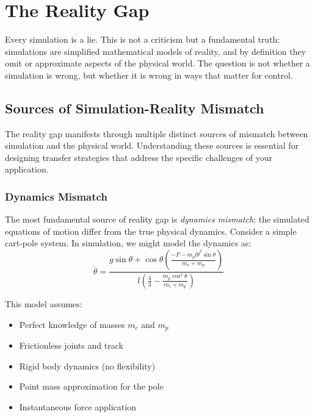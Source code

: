 \section{The Reality Gap}
\label{sec:reality_gap}

Every simulation is a lie. This is not a criticism but a fundamental truth: simulations are simplified mathematical models of reality, and by definition they omit or approximate aspects of the physical world. The question is not whether a simulation is wrong, but whether it is wrong in ways that matter for control.

\subsection{Sources of Simulation-Reality Mismatch}

The reality gap manifests through multiple distinct sources of mismatch between simulation and the physical world. Understanding these sources is essential for designing transfer strategies that address the specific challenges of your application.

\subsubsection{Dynamics Mismatch}

The most fundamental source of reality gap is \textit{dynamics mismatch}: the simulated equations of motion differ from the true physical dynamics. Consider a simple cart-pole system. In simulation, we might model the dynamics as:
\begin{equation}
\ddot{\theta} = \frac{g \sin\theta + \cos\theta \left( \frac{-F - m_p l \dot{\theta}^2 \sin\theta}{m_c + m_p} \right)}{l \left( \frac{4}{3} - \frac{m_p \cos^2\theta}{m_c + m_p} \right)}
\label{eq:cartpole_sim}
\end{equation}

This model assumes:
\begin{itemize}
    \item Perfect knowledge of masses $m_c$ and $m_p$
    \item Frictionless joints and track
    \item Rigid body dynamics (no flexibility)
    \item Point mass approximation for the pole
    \item Instantaneous force application
\end{itemize}


